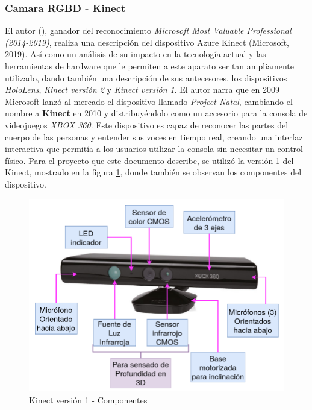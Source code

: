             \subsubsection{Camara RGBD - Kinect}

            El autor (\cite{pterneas_mastering_2022}), ganador del reconocimiento \textit{Microsoft Most Valuable Professional (2014-2019)}, realiza una descripción del dispositivo Azure Kinect (Microsoft, 2019). Así como un análisis de su impacto en la tecnología actual y las herramientas de hardware que le permiten a este aparato ser tan ampliamente utilizado, dando también una descripción de sus antecesores, los dispositivos \textit{HoloLens}, \textit{Kinect versión 2} y \textit{Kinect versión 1}.
            El autor narra que en 2009 Microsoft lanzó al mercado el dispositivo llamado \textit{Project Natal}, cambiando el nombre a \textbf{Kinect} en 2010 y distribuyéndolo como un accesorio para la consola de videojuegos \textit{XBOX 360}. Este dispositivo es capaz de reconocer las partes del cuerpo de las personas y entender sus voces en tiempo real, creando una interfaz interactiva que permitía a los usuarios utilizar la consola sin necesitar un control físico. Para el proyecto que este documento describe, se utilizó la versión 1 del Kinect, mostrado en la figura \ref{fig:Kinect_Parts}, donde también se observan los componentes del dispositivo.

            \begin{figure}[ht]
                \centering
                \includegraphics[scale=0.25]{Figures/Kinect_parts.png}
                \caption{Kinect versión 1 - Componentes}
                \label{fig:Kinect_Parts}
            \end{figure}

